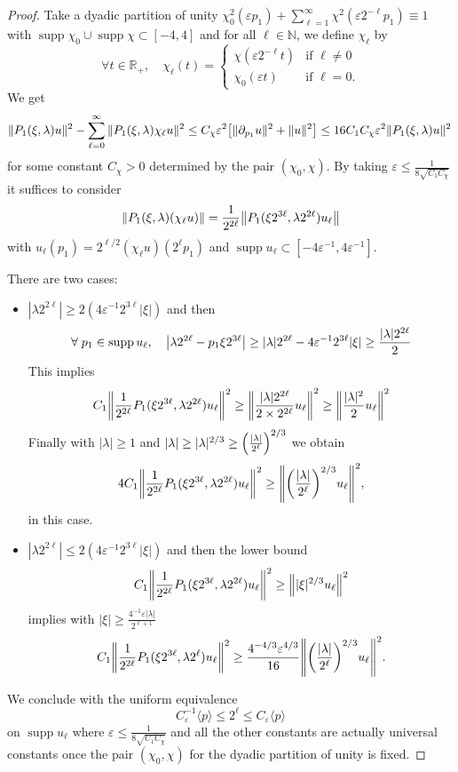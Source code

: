 \documentclass[10pt]{amsart}
\theoremstyle{definition}\newtheorem{defi}[theo]{Definition}\newtheorem{rema}[theo]{Remark}\newtheorem{exam}[theo]{Example}\newtheorem{exem}[theo]{Example}\newtheorem{nota}[theo]{Notation}
\newcommand{\R}{\mathbb{R}}
\newcommand{\N}{\mathbb{N}}
\DeclareMathOperator{\suppp}{supp}
\let\oldforall\forall
\renewcommand*{\forall}{\mathrel{\oldforall}}
\let\originalleft\left
\let\originalright\right
\renewcommand{\left}{\mathopen{}\mathclose\bgroup\originalleft}
\renewcommand{\right}{\aftergroup\egroup\originalright}
\begin{document}
\begin{proof}
Take a dyadic partition of unity $\chi_{0}^{2}(\varepsilon p_{1})+\sum_{\ell=1}^{\infty}\chi^{2}(\varepsilon 2^{-\ell}p_{1})\equiv 1$ with $\suppp \chi_{0}\cup \suppp\chi\subset [-4,4]$ and for all $ \ell \in \N$, we define $\chi_{\ell}$ by
\[
\forall t\in \R_+,\quad \chi_{\ell}(t) =
\begin{cases}
\chi(\varepsilon 2^{-\ell}t) &\text{if } \ell \neq 0\\
\chi_0(\varepsilon t) &\text{if } \ell=0 .
\end{cases}
\]
We get
\[
\|P_{1}(\xi,\lambda)u\|^{2}-\sum_{\ell=0}^{\infty}\|P_{1}(\xi,\lambda)\chi_{\ell}u\|^{2}\leq C_{\chi}\varepsilon^{2}\left[\|\partial_{p_{1}}u\|^{2}+\|u\|^{2}\right]
\leq 16C_{1}C_{\chi}\varepsilon^{2}\|P_{1}(\xi,\lambda)u\|^{2}\,
\]
for some constant $C_{\chi}>0$ determined by the pair $(\chi_0,\chi)$. By taking $\varepsilon\leq \frac{1}{8\sqrt{C_{1}C_{\chi}}}$ it suffices to consider
\[
\|P_{1}(\xi,\lambda)(\chi_{\ell}u)\|=\frac{1}{2^{2\ell}}\left\|P_{1}(\xi 2^{3\ell},\lambda 2^{2\ell})u_{\ell}\right\|
\]
with $u_{\ell}(p_{1})=2^{\ell/2}(\chi_{\ell}u)(2^{\ell}p_{1})$ and $\suppp u_{\ell}\subset [-4\varepsilon^{-1},4\varepsilon^{-1}]$.

There are two cases:
\begin{itemize}
\item $|\lambda 2^{2\ell}|\geq 2(4\varepsilon^{-1}2^{3\ell}|\xi|)$ and then
\[
\forall p_{1}\in \suppp u_{\ell},\quad\left|\lambda 2^{2\ell}-p_{1}\xi 2^{3\ell}\right|\geq |\lambda|2^{2\ell}-4\varepsilon^{-1}2^{3\ell}|\xi|
\geq \frac{|\lambda| 2^{2\ell}}{2}
\]
This implies
\[
C_{1}\left\|\frac{1}{2^{2\ell}}P_1(\xi 2^{3\ell},\lambda 2^{2\ell})u_{\ell}\right\|^{2}\geq \left\|\frac{|\lambda|2^{2\ell}}{2\times 2^{2\ell}}u_{\ell}\right\|^{2}\geq \left\|\frac{|\lambda|^{2}}{2}u_{\ell}\right\|^{2}
\]
Finally with $|\lambda|\geq 1$ and $|\lambda|\geq |\lambda|^{2/3}\geq \left(\frac{|\lambda|}{2^{\ell}}\right)^{2/3}$ we obtain
\[
4C_{1}\left\|\frac{1}{2^{2\ell}}P_1(\xi 2^{3\ell},\lambda 2^{2\ell})u_{\ell}\right\|^{2}\geq \left\|\left(\frac{|\lambda|}{2^{\ell}}\right)^{2/3}u_{\ell}\right\|^{2},
\]
in this case.
\item $|\lambda 2^{2\ell}|\leq 2 (4\varepsilon^{-1}2^{3\ell}|\xi|)$ and then the lower bound
\[
C_{1}\left\|\frac{1}{2^{2\ell}}P_{1}(\xi 2^{3\ell},\lambda 2^{2\ell})u_{\ell}\right\|^{2}\geq\left\||\xi|^{2/3}u_{\ell}\right\|^{2}
\]
implies with $|\xi|\geq \frac{4^{-1}\varepsilon |\lambda|}{2^{\ell+1}}$
\[
C_{1}\left\|\frac{1}{2^{2\ell}}P_{1}(\xi 2^{3\ell},\lambda 2^{\ell})u_{\ell}\right\|^{2}\geq \frac{4^{-4/3}\varepsilon^{4/3}}{16}\left\|\left(\frac{|\lambda|}{2^{\ell}}\right)^{2/3}u_{\ell}\right\|^{2}. 
\]
\end{itemize}
We conclude with the uniform equivalence
\[
C_{\varepsilon}^{-1}\langle p\rangle\leq 2^{\ell}\leq C_{\varepsilon}\langle p\rangle
\]
on $\suppp u_{\ell}$ where $\varepsilon\leq\frac{1}{8\sqrt{C_1 C_{\chi}}}$ and all the other constants are actually universal constants once the pair $(\chi_0,\chi)$ for the dyadic partition of unity is fixed.
\end{proof}
\end{document}
